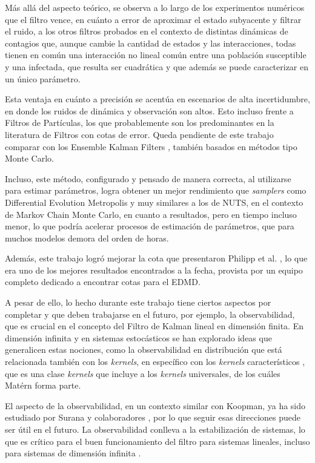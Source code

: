 Más allá del aspecto teórico, se observa a lo largo de los experimentos numéricos que el filtro vence, en cuánto a error de aproximar el estado subyacente y filtrar el ruido, a los otros filtros probados en el contexto de distintas dinámicas de contagios que, aunque cambie la cantidad de estados y las interacciones, todas tienen en común una interacción no lineal común entre una población susceptible y una infectada, que resulta ser cuadrática y que además se puede caracterizar en un único parámetro.

Esta ventaja en cuánto a precisión se acentúa en escenarios de alta incertidumbre, en donde los ruidos de dinámica y observación son altos. Esto incluso frente a Filtros de Partículas, los que probablemente son los predominantes en la literatura de Filtros con cotas de error. Queda pendiente de este trabajo comparar con los Ensemble Kalman Filters \cite{Evensen1994SequentialStatistics}, también basados en métodos tipo Monte Carlo.

Incluso, este método, configurado y pensado de manera correcta, al utilizarse para estimar parámetros, logra obtener un mejor rendimiento que \textit{samplers} como Differential Evolution Metropolis y muy similares a los de NUTS, en el contexto de Markov Chain Monte Carlo, en cuanto a resultados, pero en tiempo incluso menor, lo que podría acelerar procesos de estimación de parámetros, que para muchos modelos demora del orden de horas.

Además, este trabajo logró mejorar la cota que presentaron Philipp et al. \cite{Philipp2024ErrorOperator}, lo que era uno de los mejores resultados encontrados a la fecha, provista por un equipo completo dedicado a encontrar cotas para el EDMD.

A pesar de ello, lo hecho durante este trabajo tiene ciertos aspectos por completar y que deben trabajarse en el futuro, por ejemplo, la observabilidad, que es crucial en el concepto del Filtro de Kalman lineal en dimensión finita. En dimensión infinita y en sistemas estocásticos se han explorado ideas que generalicen estas nociones, como la observabilidad en distribución \cite{Massiani2024Data-DrivenSystems} que está relacionada también con los \textit{kernels}, en específico con los \textit{kernels} característicos \cite{Sriperumbudur2010OnMeasures, Sriperumbudur2011UniversalityMeasures}, que es una clase \textit{kernels} que incluye a los \textit{kernels} universales, de los cuáles Matérn forma parte.

El aspecto de la observabilidad, en un contexto similar con Koopman, ya ha sido estudiado por Surana y colaboradores \cite{Surana2016LinearFramework}, por lo que seguir esas direcciones puede ser útil en el futuro. La observabilidad conlleva a la estabilización de sistemas, lo que es crítico para el buen funcionamiento del filtro para sistemas lineales, incluso para sistemas de dimensión infinita \cite{Afshar2024ExtendedSystems}.

